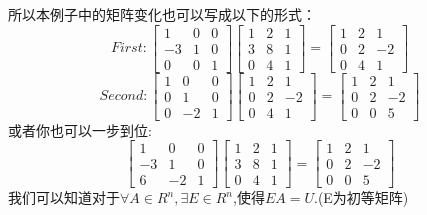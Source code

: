 \documentclass[oneside]{book}
\begin{document}
    所以本例子中的矩阵变化也可以写成以下的形式：
    $$  
    First:
    \left[
    \begin{array}{ccc}
    	1 & 0 & 0\\
    	-3 & 1 & 0\\
    	0 & 0 & 1 
    \end{array}
    \right]
    \left[
    \begin{array}{ccc}
    	1 & 2 & 1\\
    	3 & 8 & 1\\
    	0 & 4 & 1
    \end{array}
    \right] 
    =
    \left[
    \begin{array}{ccc}
    	1 & 2 & 1\\
    	0 & 2 & -2\\
    	0 & 4 & 1
    \end{array}
    \right]
    $$
    $$
    Second:
    \left[
    \begin{array}{ccc}
    	1 & 0 & 0\\
    	0 & 1 & 0\\
    	0 & -2 & 1
    \end{array}
    \right]
    \left[
    \begin{array}{ccc}
    	1 & 2 & 1\\
    	0 & 2 & -2\\
    	0 & 4 & 1
    \end{array}
    \right]
    =
    \left[
    \begin{array}{ccc}
    	1 & 2 & 1\\
    	0 & 2 & -2\\
    	0 & 0 & 5
    \end{array}
    \right]
    $$
    \qquad 或者你也可以一步到位:
    $$
    \left[
    \begin{array}{ccc}
    	1 & 0 & 0\\
    	-3 & 1 & 0\\
    	 6 & -2 & 1
    \end{array}
    \right]
    \left[
    \begin{array}{ccc}
    	1 & 2 & 1\\
    	3 & 8 & 1\\
    	0 & 4 & 1
    \end{array}
    \right]
    =
    \left[
    \begin{array}{ccc}
    	1 & 2 & 1\\
    	0 & 2 & -2\\
    	0 & 0 & 5
    \end{array}
    \right]
    $$
    \qquad 我们可以知道对于$ \forall A\in R^{n}, \exists E \in R^{n} $,使得$ EA=U $.(E为初等矩阵)
    
\end{document}
